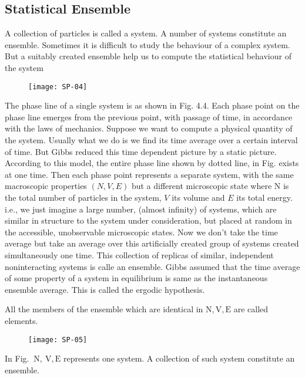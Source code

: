 \subsection{Statistical Ensemble}
A collection of particles is called a system. A number of systems constitute an ensemble. Sometimes it is difficult to study the behaviour of a complex system. But a suitably created ensemble help us to compute the statistical behaviour of the system
\begin{figure}[H]
	\centering
	\texttt{[image: SP-04]}
\end{figure}
The phase line of a single system is as shown in Fig. 4.4. Each phase point on the phase line emerges from the previous point, with passage of time, in accordance with the laws of mechanics. Suppose we want to compute a physical quantity of the system. Usually what we do is we find its time average over a certain interval of time. But Gibbs reduced this time dependent picture by a static picture. According to this model, the entire phase line shown by dotted line, in Fig. exists at one time. Then each phase point represents a separate system, with the same macroscopic properties $(N, V, E)$ but a different microscopic state where $\mathrm{N}$ is the total number of particles in the system, $V$ its volume and $E$ its total energy. i.e., we just imagine a large number, (almost infinity) of systems, which are similar in structure to the system under consideration, but placed at random in the accessible, unobservable microscopic states. Now we don't take the time average but take an average over this artificially created group of systems created simultaneously one time. This collection of replicas of similar, independent noninteracting systems is calle an ensemble. Gibbs assumed that the time average of some property of a system in equilibrium is same as the instantaneous ensemble average. This is called the ergodic hypothesis.

All the members of the ensemble which are identical in $\mathrm{N}, \mathrm{V}, \mathrm{E}$ are called elements.
\begin{figure}[H]
	\centering
	\texttt{[image: SP-05]}
\end{figure}
In Fig. $\mathrm{~N}, \mathrm{~V}, \mathrm{E}$ represents one system. A collection of such system constitute an ensemble.
